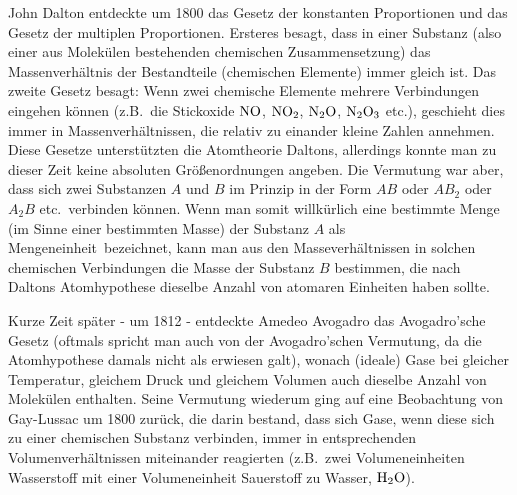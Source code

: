 John Dalton 
entdeckte um 1800 das Gesetz der konstanten Proportionen und das
Gesetz der multiplen Proportionen. Ersteres besagt, dass in einer Substanz (also einer aus Molek\"ulen
bestehenden chemischen Zusammensetzung) das Massenverh\"altnis der Bestandteile
(chemischen Elemente) immer gleich ist. Das zweite Gesetz besagt: Wenn zwei chemische Elemente
mehrere Verbindungen eingehen k\"onnen (z.B.\ die Stickoxide ${\rm NO}$, ${\rm NO}_2$, ${\rm N_2O}$,
${\rm N_2O_3}$ etc.), 
geschieht dies immer in Massenverh\"altnissen, die relativ zu einander kleine Zahlen annehmen. Diese 
Gesetze unterst\"utzten die Atomtheorie Daltons, allerdings konnte man zu dieser Zeit keine absoluten
Gr\"o\ss enordnungen angeben. Die Vermutung war aber, dass sich zwei Substanzen $A$ und $B$
im Prinzip in der Form $AB$ oder $AB_2$ oder $A_2B$ etc.\ verbinden k\"onnen. Wenn man somit
willk\"urlich eine bestimmte Menge (im Sinne einer bestimmten Masse) der Substanz $A$ als 
\glqq Mengeneinheit\grqq\ bezeichnet, kann man aus den Masseverh\"altnissen in solchen chemischen 
Verbindungen die Masse der Substanz $B$ bestimmen, die nach Daltons Atomhypothese dieselbe Anzahl 
von atomaren Einheiten haben sollte. 

Kurze Zeit sp\"ater - um 1812 - entdeckte 
Amedeo Avogadro das Avogadro'sche Gesetz (oftmals spricht
man auch von der Avogadro'schen Vermutung, da die Atomhypothese damals nicht als erwiesen galt), 
wonach (ideale) Gase bei gleicher Temperatur, gleichem Druck und gleichem Volumen auch dieselbe Anzahl 
von Molek\"ulen enthalten. Seine Vermutung wiederum ging auf eine Beobachtung von Gay-Lussac um 1800
zur\"uck, die darin bestand, dass sich Gase, wenn diese sich zu einer chemischen Substanz verbinden, immer
in entsprechenden Volumenverh\"altnissen miteinander reagierten (z.B.\ zwei Volumeneinheiten Wasserstoff
mit einer Volumeneinheit Sauerstoff zu Wasser, ${\rm H_2O}$). 

